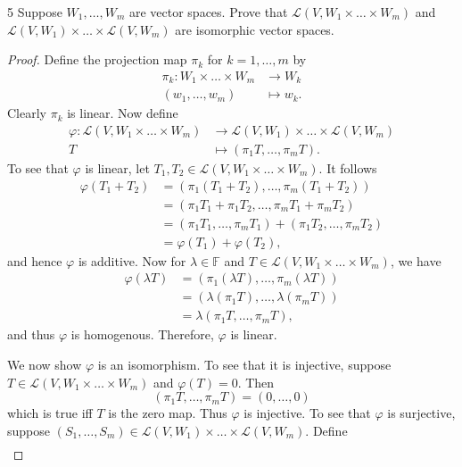 \documentclass[11pt]{extarticle}
\newenvironment{problem}[1]{\begin{prob*}{#1}{}}{\end{prob*}}
\newcommand{\F}{\mathbb{F}}
\newcommand{\Hom}{\mathcal{L}}
\begin{document}
\begin{problem}{5}
Suppose $W_1,\dots, W_m$ are vector spaces.  Prove that $\Hom(V, W_1\times \dots \times W_m)$ and $\Hom(V, W_1)\times \dots \times \Hom(V, W_m)$ are isomorphic vector spaces.
\end{problem}
\begin{proof}
Define the projection map $\pi_k$ for $k=1,\dots,m$ by
\begin{align*}
\pi_k: W_1\times \dots \times W_m &\to W_k \\
          (w_1,\dots, w_m) &\mapsto w_k.
\end{align*}
Clearly $\pi_k$ is linear.  Now define
\begin{align*}
\varphi: \Hom(V, W_1\times \dots \times W_m) &\to \Hom(V, W_1)\times \dots \times \Hom(V, W_m)\\
             T &\mapsto (\pi_1T, \dots, \pi_mT).
\end{align*}
To see that $\varphi$ is linear, let $T_1, T_2\in \Hom(V, W_1\times \dots \times W_m)$.  It follows
\begin{align*}
\varphi(T_1 + T_2) &= (\pi_1(T_1 + T_2), \dots, \pi_m(T_1 + T_2))\\
&= (\pi_1T_1 + \pi_1T_2, \dots, \pi_mT_1 + \pi_mT_2)\\
&= (\pi_1T_1, \dots, \pi_mT_1) + (\pi_1T_2, \dots, \pi_mT_2)\\
&= \varphi(T_1) + \varphi(T_2),
\end{align*}
and hence $\varphi$ is additive.  Now for $\lambda\in\F$ and $T\in \Hom(V, W_1\times \dots \times W_m)$, we have
\begin{align*}
\varphi(\lambda T) &= (\pi_1(\lambda T), \dots, \pi_m(\lambda T))\\
&=  (\lambda(\pi_1 T), \dots, \lambda(\pi_m T))\\
&= \lambda(\pi_1T, \dots, \pi_mT),
\end{align*}
and thus $\varphi$ is homogenous.  Therefore, $\varphi$ is linear.
\par We now show $\varphi$ is an isomorphism.  To see that it is injective, suppose $T\in\Hom(V, W_1\times \dots \times W_m)$ and $\varphi(T) = 0$.
Then
\begin{equation*}
(\pi_1T, \dots, \pi_mT) = (0,\dots, 0)
\end{equation*}
which is true iff $T$ is the zero map.  Thus $\varphi$ is injective.  To see that $\varphi$ is surjective, suppose $(S_1,\dots, S_m)\in\Hom(V,W_1)\times \dots\times \Hom(V,W_m)$.  Define
\begin{align*}

\end{align*}
\end{proof}
\end{document}
